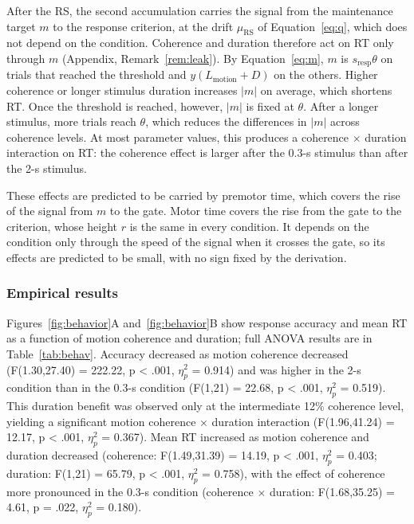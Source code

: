 \documentclass[a4paper,11pt]{article}
\theoremstyle{definition}
\newcommand{\1}{\mathbbm{1}}
\begin{document}
After the RS, the second accumulation carries the signal from the maintenance target $m$ to the response criterion, at the drift $\mu_{\mathrm{RS}}$ of Equation~\eqref{eq:q}, which does not depend on the condition. Coherence and duration therefore act on RT only through $m$ (Appendix, Remark~\ref{rem:leak}). By Equation~\eqref{eq:m}, $m$ is $s_{\mathrm{resp}}\theta$ on trials that reached the threshold and $y(L_{\mathrm{motion}}+D)$ on the others. Higher coherence or longer stimulus duration increases $|m|$ on average, which shortens RT. Once the threshold is reached, however, $|m|$ is fixed at $\theta$. After a longer stimulus, more trials reach $\theta$, which reduces the differences in $|m|$ across coherence levels. At most parameter values, this produces a coherence $\times$ duration interaction on RT: the coherence effect is larger after the 0.3-s stimulus than after the 2-s stimulus.

These effects are predicted to be carried by premotor time, which covers the rise of the signal from $m$ to the gate. Motor time covers the rise from the gate to the criterion, whose height $r$ is the same in every condition. It depends on the condition only through the speed of the signal when it crosses the gate, so its effects are predicted to be small, with no sign fixed by the derivation.


\subsubsection{Empirical results}

Figures~\ref{fig:behavior}A and~\ref{fig:behavior}B show response accuracy and mean RT as a function of motion coherence and duration; full ANOVA results are in Table~\ref{tab:behav}. Accuracy decreased as motion coherence decreased (F(1.30,27.40) = 222.22, p < .001, $\eta_{p}^{2}$ = 0.914) and was higher in the 2-s condition than in the 0.3-s condition (F(1,21) = 22.68, p < .001, $\eta_{p}^{2}$ = 0.519). This duration benefit was observed only at the intermediate 12\% coherence level, yielding a significant motion coherence $\times$ duration interaction (F(1.96,41.24) = 12.17, p < .001, $\eta_{p}^{2}$ = 0.367). Mean RT increased as motion coherence and duration decreased (coherence: F(1.49,31.39) = 14.19, p < .001, $\eta_{p}^{2}$ = 0.403; duration: F(1,21) = 65.79, p < .001, $\eta_{p}^{2}$ = 0.758), with the effect of coherence more pronounced in the 0.3-s condition (coherence $\times$ duration: F(1.68,35.25) = 4.61, p = .022, $\eta_{p}^{2}$ = 0.180).
\end{document}
